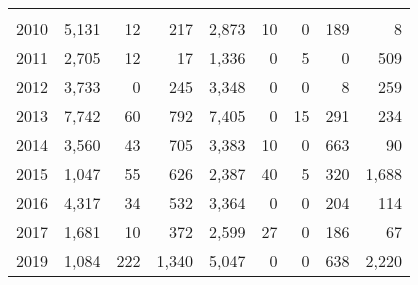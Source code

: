 \documentclass[
]{article}
\begin{document}
\begin{table}
\begin{tabular}[t]{lrrrrrrrr}
\addlinespace[0.3em]
\multicolumn{9}{l}{\textbf{Piasuk River Delta}}\\
\hspace{1em}\hspace{1em}\hspace{1em}\hspace{1em}2010 & 5,131 & 12 & 217 & 2,873 & 10 & 0 & 189 & 8\\
\hspace{1em}\hspace{1em}\hspace{1em}\hspace{1em}2011 & 2,705 & 12 & 17 & 1,336 & 0 & 5 & 0 & 509\\
\hspace{1em}\hspace{1em}\hspace{1em}\hspace{1em}2012 & 3,733 & 0 & 245 & 3,348 & 0 & 0 & 8 & 259\\
\hspace{1em}\hspace{1em}\hspace{1em}\hspace{1em}2013 & 7,742 & 60 & 792 & 7,405 & 0 & 15 & 291 & 234\\
\hspace{1em}\hspace{1em}\hspace{1em}\hspace{1em}2014 & 3,560 & 43 & 705 & 3,383 & 10 & 0 & 663 & 90\\
\hspace{1em}\hspace{1em}\hspace{1em}\hspace{1em}2015 & 1,047 & 55 & 626 & 2,387 & 40 & 5 & 320 & 1,688\\
\hspace{1em}\hspace{1em}\hspace{1em}\hspace{1em}2016 & 4,317 & 34 & 532 & 3,364 & 0 & 0 & 204 & 114\\
\hspace{1em}\hspace{1em}\hspace{1em}\hspace{1em}2017 & 1,681 & 10 & 372 & 2,599 & 27 & 0 & 186 & 67\\
\hspace{1em}\hspace{1em}\hspace{1em}\hspace{1em}2019 & 1,084 & 222 & 1,340 & 5,047 & 0 & 0 & 638 & 2,220\\

\end{tabular}
\end{table}
\end{document}

